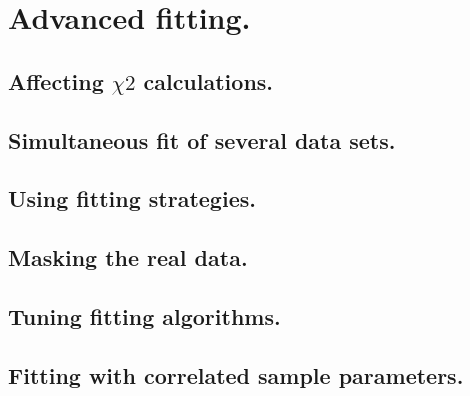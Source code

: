 \section {Advanced fitting.} 

\subsection{Affecting $\chi2$ calculations.}
\subsection{Simultaneous fit of several data sets.}
\subsection{Using fitting strategies.}
\subsection{Masking the real data.}
\subsection{Tuning fitting algorithms.}
\subsection{Fitting with correlated sample parameters.}

